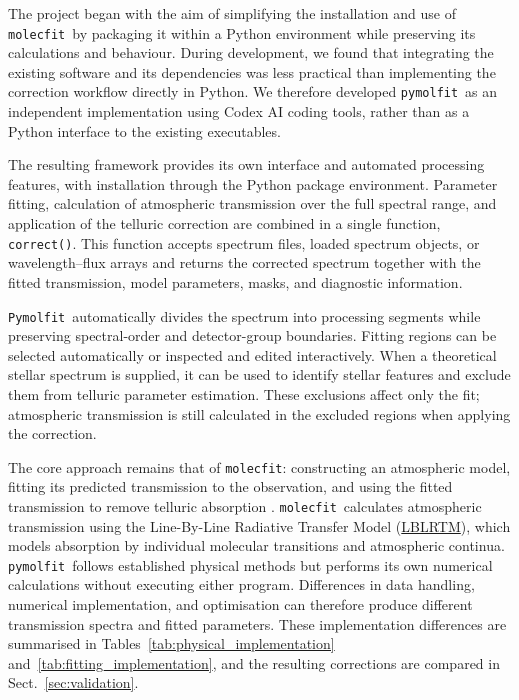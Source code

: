 \documentclass{aa}
\newcommand{\molecfit}{{\texttt{molecfit}}}
\newcommand{\LBLRTM}{\href{https://github.com/AER-RC/LBLRTM}{LBLRTM}}
\newcommand{\Pymolfit}{\texttt{Pymolfit}}
\newcommand{\pymolfit}{\texttt{pymolfit}}
\begin{document}
The project began with the aim of simplifying the installation and use of \molecfit\ by packaging it within a Python environment while preserving its calculations and behaviour. During development, we found that integrating the existing software and its dependencies was less practical than implementing the correction workflow directly in Python. We therefore developed \pymolfit\ as an independent implementation using Codex AI coding tools, rather than as a Python interface to the existing executables.

The resulting framework provides its own interface and automated processing features, with installation through the Python package environment. Parameter fitting, calculation of atmospheric transmission over the full spectral range, and application of the telluric correction are combined in a single function, \texttt{correct()}. This function accepts spectrum files, loaded spectrum objects, or wavelength--flux arrays and returns the corrected spectrum together with the fitted transmission, model parameters, masks, and diagnostic information.

\Pymolfit\ automatically divides the spectrum into processing segments while preserving spectral-order and detector-group boundaries. Fitting regions can be selected automatically or inspected and edited interactively. When a theoretical stellar spectrum is supplied, it can be used to identify stellar features and exclude them from telluric parameter estimation. These exclusions affect only the fit; atmospheric transmission is still calculated in the excluded regions when applying the correction.

The core approach remains that of \molecfit: constructing an atmospheric model, fitting its predicted transmission to the observation, and using the fitted transmission to remove telluric absorption \citep{MOLECFIT1,MOLECFIT2}. \molecfit\ calculates atmospheric transmission using the Line-By-Line Radiative Transfer Model (\LBLRTM), which models absorption by individual molecular transitions and atmospheric continua. \pymolfit\ follows established physical methods but performs its own numerical calculations without executing either program. Differences in data handling, numerical implementation, and optimisation can therefore produce different transmission spectra and fitted parameters. These implementation differences are summarised in Tables~\ref{tab:physical_implementation} and~\ref{tab:fitting_implementation}, and the resulting corrections are compared in Sect.~\ref{sec:validation}.
\end{document}
